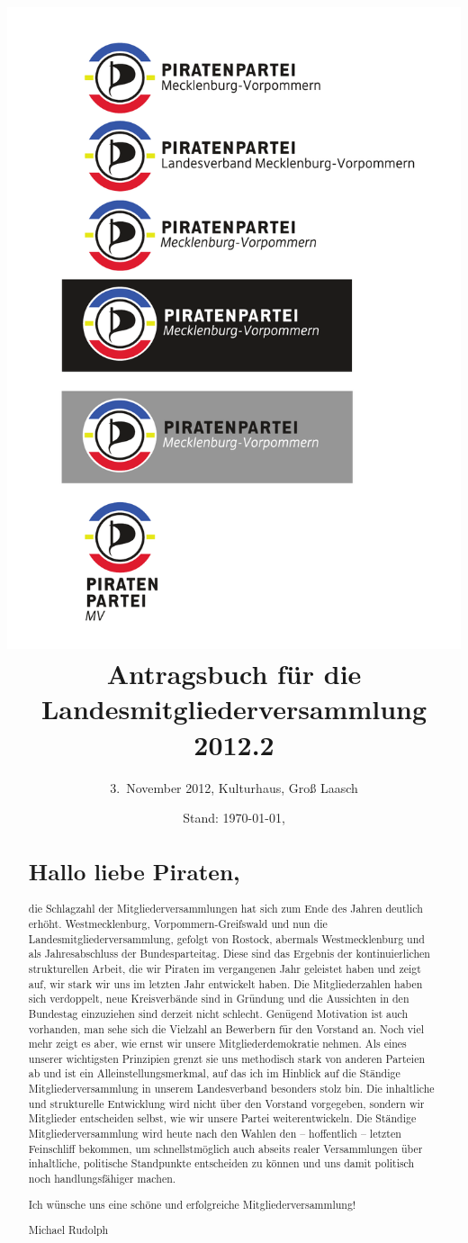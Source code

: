 \documentclass[a4paper,10pt]{scrreprt}
\title{\includegraphics[scale=1]{icons/logofront}\vspace{2em}\\Antragsbuch für die\\ Landesmitgliederversammlung 2012.2}
\subtitle{3.\ November 2012, Kulturhaus, Groß Laasch}
\date{Stand: \today, \uhri{}}
\begin{document}
\maketitle

\begin{abstract}
\null
\vfill

\section*{Hallo liebe Piraten,}%

die Schlagzahl der Mitgliederversammlungen hat sich zum Ende des Jahren deutlich erhöht. Westmecklenburg, Vorpommern-Greifswald und nun die Landesmitgliederversammlung, gefolgt von Rostock, abermals Westmecklenburg und als Jahresabschluss der Bundesparteitag. Diese sind das Ergebnis der kontinuierlichen strukturellen Arbeit, die wir Piraten im vergangenen Jahr geleistet haben und zeigt auf, wir stark wir uns im letzten Jahr entwickelt haben. Die Mitgliederzahlen haben sich verdoppelt, neue Kreisverbände sind in Gründung und die Aussichten in den Bundestag einzuziehen sind derzeit nicht schlecht. Genügend Motivation ist auch vorhanden, man sehe sich die Vielzahl an Bewerbern für den Vorstand an. Noch viel mehr zeigt es aber, wie ernst wir unsere Mitgliederdemokratie nehmen. Als eines unserer wichtigsten Prinzipien grenzt sie uns methodisch stark von anderen Parteien ab und ist ein Alleinstellungsmerkmal, auf das ich im Hinblick auf die Ständige Mitgliederversammlung in unserem Landesverband besonders stolz bin. Die inhaltliche und strukturelle Entwicklung wird nicht über den Vorstand vorgegeben, sondern wir Mitglieder entscheiden selbst, wie wir unsere Partei weiterentwickeln. Die Ständige Mitgliederversammlung wird heute nach den Wahlen den – hoffentlich – letzten Feinschliff bekommen, um schnellstmöglich auch abseits realer Versammlungen über inhaltliche, politische Standpunkte entscheiden zu können und uns damit politisch noch handlungsfähiger machen.\medskip

Ich wünsche uns eine schöne und erfolgreiche Mitgliederversammlung!\bigskip

  Michael Rudolph

\vfill
\vfill


\end{abstract}
\end{document}
